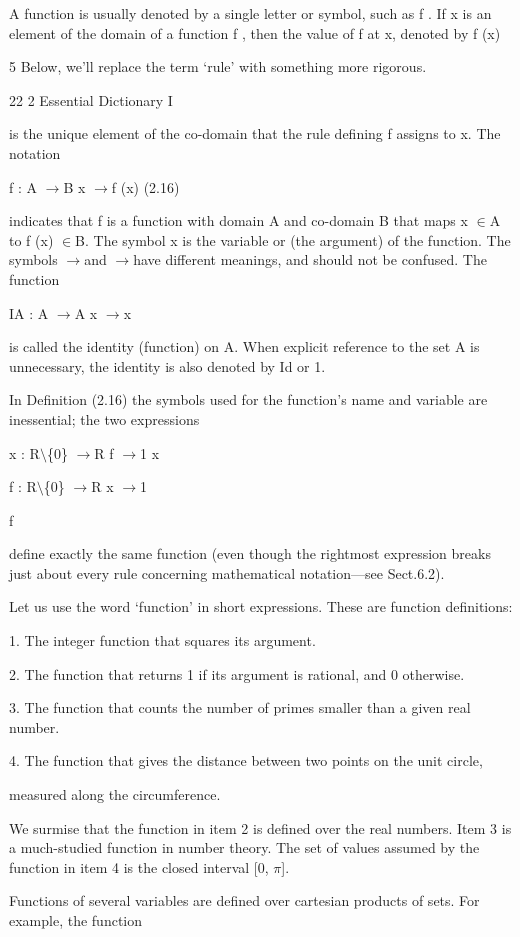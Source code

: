 \documentclass[11pt]{article}
\theoremstyle{plain}
\theoremstyle{definition}
\begin{document}
A function is usually denoted by a single letter or symbol, such as f . If x is an element of the domain of a function f , then the value of f at x, denoted by f (x)

5 Below, we'll replace the term `rule' with something more rigorous.

22 2 Essential Dictionary I

is the unique element of the co-domain that the rule defining f assigns to x. The notation

f : A $\to$B x $\to$f (x) (2.16)

indicates that f is a function with domain A and co-domain B that maps x $\in$A to f (x) $\in$B. The symbol x is the variable or (the argument) of the function. The symbols $\to$and $\to$have different meanings, and should not be confused. The function

IA : A $\to$A x $\to$x

is called the identity (function) on A. When explicit reference to the set A is unnecessary, the identity is also denoted by Id or 1.

In Definition (2.16) the symbols used for the function's name and variable are inessential; the two expressions

x : R$\setminus$\{0\} $\to$R f $\to$1 x

f : R$\setminus$\{0\} $\to$R x $\to$1

f

define exactly the same function (even though the rightmost expression breaks just about every rule concerning mathematical notation---see Sect.6.2).

Let us use the word `function' in short expressions. These are function definitions:

1. The integer function that squares its argument.

2. The function that returns 1 if its argument is rational, and 0 otherwise.

3. The function that counts the number of primes smaller than a given real number.

4. The function that gives the distance between two points on the unit circle,

measured along the circumference.

We surmise that the function in item 2 is defined over the real numbers. Item 3 is a much-studied function in number theory. The set of values assumed by the function in item 4 is the closed interval [0, $\pi$].

Functions of several variables are defined over cartesian products of sets. For example, the function
\end{document}
